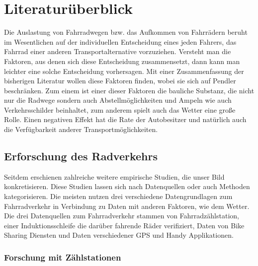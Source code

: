 \documentclass[a4paper,12pt]{thesis}
\begin{document}
\chapter{Literaturüberblick}

Die Auslastung von Fahrradwegen bzw. das Aufkommen von Fahrrädern beruht im Wesentlichen auf der individuellen Entscheidung eines jeden Fahrers, das Fahrrad einer anderen Transportalternative vorzuziehen. Versteht man die Faktoren, aus denen sich diese Entscheidung zusammensetzt, dann kann man leichter eine solche Entscheidung vorhersagen. Mit einer Zusammenfassung der bisherigen Literatur wollen \cite{Heinen2010} diese Faktoren finden, wobei sie sich auf Pendler beschränken. Zum einem ist einer dieser Faktoren die bauliche Substanz, die nicht nur die Radwege sondern auch Abstellmöglichkeiten und Ampeln wie auch Verkehrsschilder beinhaltet, zum anderem spielt auch das Wetter eine große Rolle. Einen negativen Effekt hat die Rate der Autobesitzer und natürlich auch die Verfügbarkeit anderer Transportmöglichkeiten.\\

\section{Erforschung des Radverkehrs}

Seitdem erschienen zahlreiche weitere empirische Studien, die unser Bild konkretisieren. Diese Studien lassen sich nach Datenquellen oder auch Methoden kategorisieren. Die meisten nutzen drei verschiedene Datengrundlagen zum Fahrradverkehr in Verbindung zu Daten mit anderen Faktoren, wie dem Wetter. Die drei Datenquellen zum Fahrradverkehr stammen von Fahrradzählstation, einer Induktionsschleife die darüber fahrende Räder verifiziert, Daten von Bike Sharing Diensten und Daten verschiedener GPS und Handy Applikationen.\\

\subsection{Forschung mit Zählstationen}
\end{document}
